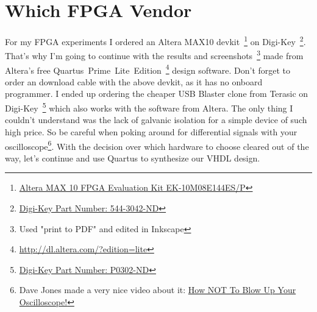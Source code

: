 \documentclass[a4paper]{article}
\begin{document}
\section{Which FPGA Vendor}
For my FPGA experiments I ordered an Altera MAX10 devkit~\footnote{\href{https://www.altera.com/products/boards_and_kits/dev-kits/altera/kit-max-10-evaluation.html}{Altera MAX 10 FPGA Evaluation Kit EK-10M08E144ES/P}} on Digi-Key~\footnote{\href{http://www.digikey.de/short/3pd4ch}{Digi-Key Part Number: 544-3042-ND}}.
That's why I'm going to continue with the results and screenshots~\footnote{Used "print to PDF" and edited in Inkscape} made from Altera's free Quartus~Prime~Lite~Edition~\footnote{\url{http://dl.altera.com/?edition=lite}} design software.
Don't forget to order an download cable with the above devkit, as it has no onboard programmer.
I ended up ordering the cheaper USB Blaster clone from Terasic on Digi-Key~\footnote{\href{http://www.digikey.de/short/3pd4j9}{Digi-Key Part Number: P0302-ND}} which also works with the software from Altera.
The only thing I couldn't understand was the lack of galvanic isolation for a simple device of such high price.
So be careful when poking around for differential signals with your oscilloscope\footnote{Dave Jones made a very nice video about it: \href{https://youtu.be/xaELqAo4kkQ}{How NOT To Blow Up Your Oscilloscope!}}.
With the decision over which hardware to choose cleared out of the way, let's continue and use Quartus to synthesize our VHDL design.
\newpage
\end{document}
